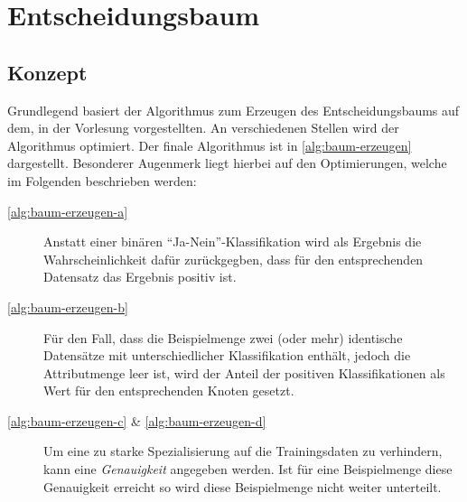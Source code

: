 \newpage
\section{Entscheidungsbaum}\label{sec:entscheidungsbaum}

\subsection{Konzept}
Grundlegend basiert der Algorithmus zum Erzeugen des Entscheidungsbaums auf dem,
in der Vorlesung vorgestellten. An verschiedenen Stellen wird der Algorithmus optimiert.
Der finale Algorithmus ist in \autoref{alg:baum-erzeugen} dargestellt.
Besonderer Augenmerk liegt hierbei auf den Optimierungen, welche im Folgenden beschrieben werden:
\begin{description}
    \item[\autoref{alg:baum-erzeugen-a}] Anstatt einer binären \enquote{Ja-Nein}-Klassifikation wird als Ergebnis die Wahrscheinlichkeit dafür zurückgegben,
                    dass für den entsprechenden Datensatz das Ergebnis positiv ist.

    \item[\autoref{alg:baum-erzeugen-b}] Für den Fall, dass die Beispielmenge zwei (oder mehr) identische Datensätze mit unterschiedlicher Klassifikation enthält,
    jedoch die Attributmenge leer ist, wird der Anteil der positiven Klassifikationen als Wert für den entsprechenden Knoten gesetzt.
    \item[\autoref{alg:baum-erzeugen-c} \& \autoref{alg:baum-erzeugen-d}] Um eine zu starke Spezialisierung auf die Trainingsdaten zu verhindern, kann eine \textit{Genauigkeit} angegeben werden.
    Ist für eine Beispielmenge diese Genauigkeit erreicht so wird diese Beispielmenge nicht weiter unterteilt.
\end{description}

